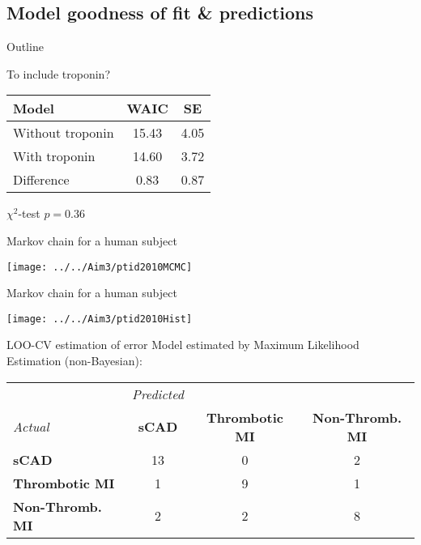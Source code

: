 \documentclass[xcolor=dvipsnames]{beamer}
\begin{document}
\subsection{Model goodness of fit \& predictions}
\begin{frame}{Outline}
\vspace{-10.5pt}
\tableofcontents[currentsection,subsectionstyle=show/shaded/hide]
\end{frame}

\begin{frame}{To include troponin?}
\vspace{-10.5pt}
\begin{center}
\begin{tabular}{lcc}
\hline
Model & WAIC  & SE \\
\hline
Without troponin & 15.43 & 4.05 \\ 
With troponin & 14.60 & 3.72 \\
Difference & 0.83 & 0.87 \\
\hline
\end{tabular}

$\chi^2$-test $p=0.36$
\end{center}
\end{frame}

\begin{frame}{Markov chain for a human subject}
\vspace{-5pt}
\begin{center}
\texttt{[image: ../../Aim3/ptid2010MCMC]}
\end{center}
\end{frame}

\begin{frame}{Markov chain for a human subject}
\vspace{-7pt}
\begin{center}
\texttt{[image: ../../Aim3/ptid2010Hist]}
\end{center}
\end{frame}

\begin{frame}{LOO-CV estimation of error}
\vspace{-15pt}
Model estimated by Maximum Likelihood Estimation (non-Bayesian):
\vspace{4ex}

\begin{tabular}{l|ccc}
& \emph{Predicted} & & \\
\emph{Actual}  & \textbf{sCAD} & \textbf{Thrombotic MI} & \textbf{Non-Thromb. MI} \\
\hline
\textbf{sCAD} & 13 &  0 & 2\\
\textbf{Thrombotic MI} &   1 & 9 &  1\\
\textbf{Non-Thromb. MI}  & 2  & 2 & 8 
\end{tabular}
\end{frame}
\end{document}
